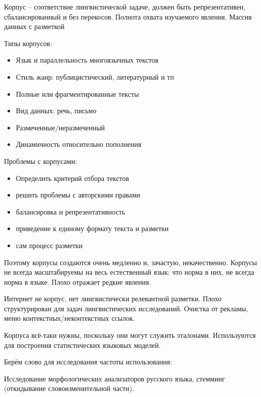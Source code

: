 \documentclass[a4paper]{article}
\begin{document}
Корпус -- соответствие лингвистической задаче, должен быть репрезентативен, сбалансированный и без перекосов. Полнота охвата изучаемого явления. Массив данных с разметкой

Типы корпусов: \begin{itemize}
	\item Язык и параллельность многоязычных текстов
	\item Стиль жанр: публицистический, литературный и тп
	\item Полные или фрагментированные тексты
	\item Вид данных: речь, письмо
	\item Размеченные/неразмеченный
	\item Динамичность относительно пополнения
\end{itemize}

Проблемы с корпусами:
\begin{itemize}
	\item Определить критерий отбора текстов
	\item решить проблемы с авторскими правами
	\item балансировка и репрезентативность
	\item приведение к единому формату текста и разметки
	\item сам процесс разметки
\end{itemize}

Поэтому корпусы создаются очень медленно и, зачастую, некачественно.
Корпусы не всегда масштабируемы на весь естественный язык: что норма в них, не всегда норма в языке.
Плохо отражает редкие явления.


Интернет не корпус, нет лингвистически релевантной разметки.
Плохо структурирован для задач лингвистических исследований.
Очистка от рекламы, меню контекстных/неконтекстных ссылок.

Корпуса всё-таки нужны, поскольку они могут служить эталонами.
Используются для построения статистических языковых моделей.

Берём слово для исследования частоты использования:

Исследование морфологических анализаторов русского языка, стемминг (откидывание словоизменительной части).
\end{document}
